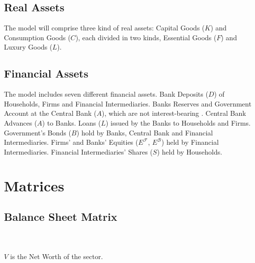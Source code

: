 \documentclass[a4paper, headings=standardclasses]{scrartcl}
\begin{document}
\subsection{Real Assets}
The model will comprise three kind of real assets: Capital Goods ($K$) and Consumption Goods ($C$), each divided in two kinds, Essential Goods ($F$) and Luxury Goods ($L$).

\subsection{Financial Assets}
The model includes seven different financial assets. 
Bank Deposits ($D$) of Households, Firms and Financial Intermediaries. 
Banks Reserves and Government Account at the Central Bank ($A$), which are not interest-bearing . 
Central Bank Advances ($A$) to Banks.
Loans ($L$) issued by the Banks to Households and Firms. Government's Bonds ($B$) hold by Banks, Central Bank and Financial Intermediaries. 
Firms' and Banks' Equities ($E^\mathcal{F}$, $E^\mathcal{B}$) held by Financial Intermediaries.
Financial Intermediaries' Shares ($S$) held by Households.

\section{Matrices}
\subsection{Balance Sheet Matrix}
\\ \\
\vspace{1em}
$V$ is the Net Worth of the sector.
\end{document}
